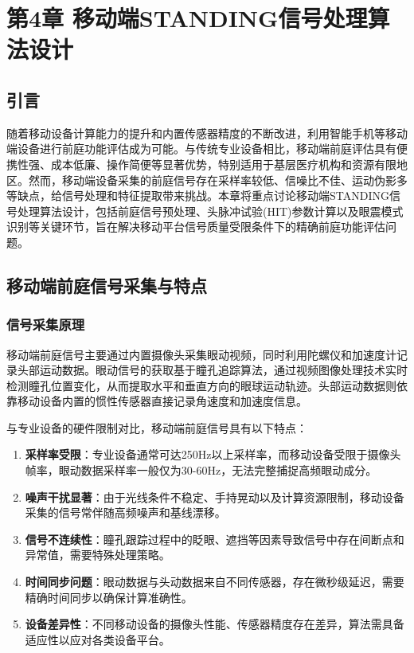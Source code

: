 \chapter{第4章 移动端STANDING信号处理算法设计}

\section{引言}

随着移动设备计算能力的提升和内置传感器精度的不断改进，利用智能手机等移动端设备进行前庭功能评估成为可能。与传统专业设备相比，移动端前庭评估具有便携性强、成本低廉、操作简便等显著优势，特别适用于基层医疗机构和资源有限地区。然而，移动端设备采集的前庭信号存在采样率较低、信噪比不佳、运动伪影多等缺点，给信号处理和特征提取带来挑战。本章将重点讨论移动端STANDING信号处理算法设计，包括前庭信号预处理、头脉冲试验(HIT)参数计算以及眼震模式识别等关键环节，旨在解决移动平台信号质量受限条件下的精确前庭功能评估问题。

\section{移动端前庭信号采集与特点}

\subsection{信号采集原理}

移动端前庭信号主要通过内置摄像头采集眼动视频，同时利用陀螺仪和加速度计记录头部运动数据。眼动信号的获取基于瞳孔追踪算法，通过视频图像处理技术实时检测瞳孔位置变化，从而提取水平和垂直方向的眼球运动轨迹。头部运动数据则依靠移动设备内置的惯性传感器直接记录角速度和加速度信息。

与专业设备的硬件限制对比，移动端前庭信号具有以下特点：

\begin{enumerate}
  \item \textbf{采样率受限}：专业设备通常可达250Hz以上采样率，而移动设备受限于摄像头帧率，眼动数据采样率一般仅为30-60Hz，无法完整捕捉高频眼动成分。

  \item \textbf{噪声干扰显著}：由于光线条件不稳定、手持晃动以及计算资源限制，移动设备采集的信号常伴随高频噪声和基线漂移。

  \item \textbf{信号不连续性}：瞳孔跟踪过程中的眨眼、遮挡等因素导致信号中存在间断点和异常值，需要特殊处理策略。

  \item \textbf{时间同步问题}：眼动数据与头动数据来自不同传感器，存在微秒级延迟，需要精确时间同步以确保计算准确性。

  \item \textbf{设备差异性}：不同移动设备的摄像头性能、传感器精度存在差异，算法需具备适应性以应对各类设备平台。
\end{enumerate}

